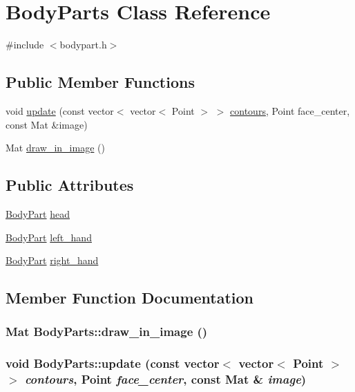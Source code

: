 \hypertarget{class_body_parts}{
\section{BodyParts Class Reference}
\label{class_body_parts}
}


{\ttfamily \#include $<$bodypart.h$>$}

\subsection*{Public Member Functions}
\begin{DoxyCompactItemize}
\item 
void \hyperlink{class_body_parts_ac9c779000cd02105da1b00d5a1d7c9d6}{update} (const vector$<$ vector$<$ Point $>$ $>$ \hyperlink{common_8h_adb337241440422f19b5200479d510b76}{contours}, Point face\_\-center, const Mat \&image)
\item 
Mat \hyperlink{class_body_parts_a5e1ba1dcf65841114505359dcbeea512}{draw\_\-in\_\-image} ()
\end{DoxyCompactItemize}
\subsection*{Public Attributes}
\begin{DoxyCompactItemize}
\item 
\hyperlink{class_body_part}{BodyPart} \hyperlink{class_body_parts_a4639c1a935a64333ef1658c1a320f4a7}{head}
\item 
\hyperlink{class_body_part}{BodyPart} \hyperlink{class_body_parts_ad8764fe7847e709d38dab525b83e3825}{left\_\-hand}
\item 
\hyperlink{class_body_part}{BodyPart} \hyperlink{class_body_parts_a92eb5e818287c46c6125872f9e504ad5}{right\_\-hand}
\end{DoxyCompactItemize}


\subsection{Member Function Documentation}
\hypertarget{class_body_parts_a5e1ba1dcf65841114505359dcbeea512}{
\subsubsection[{draw\_\-in\_\-image}]{\setlength{\rightskip}{0pt plus 5cm}Mat BodyParts::draw\_\-in\_\-image ()}}
\label{class_body_parts_a5e1ba1dcf65841114505359dcbeea512}
\hypertarget{class_body_parts_ac9c779000cd02105da1b00d5a1d7c9d6}{
\subsubsection[{update}]{\setlength{\rightskip}{0pt plus 5cm}void BodyParts::update (const vector$<$ vector$<$ Point $>$ $>$ {\em contours}, \/  Point {\em face\_\-center}, \/  const Mat \& {\em image})}}
\label{class_body_parts_ac9c779000cd02105da1b00d5a1d7c9d6}


